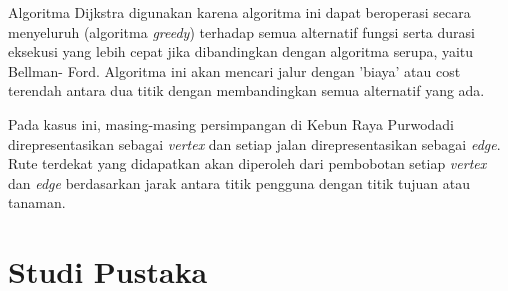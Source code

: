 \documentclass[conference]{IEEEtran}
\begin{document}
    Algoritma Dijkstra digunakan karena algoritma ini dapat
    beroperasi secara menyeluruh (algoritma \textit{greedy}) terhadap
    semua alternatif fungsi serta durasi eksekusi yang lebih cepat
    jika dibandingkan dengan algoritma serupa, yaitu Bellman-
    Ford. Algoritma ini akan mencari jalur dengan ’biaya’ atau cost 
    terendah antara dua titik dengan membandingkan semua alternatif yang ada.
    
    Pada kasus ini, masing-masing persimpangan di Kebun
    Raya Purwodadi direpresentasikan sebagai \textit{vertex} dan setiap
    jalan direpresentasikan sebagai \textit{edge}. Rute terdekat yang didapatkan
    akan diperoleh dari pembobotan setiap \textit{vertex} dan \textit{edge}
    berdasarkan jarak antara titik pengguna dengan titik tujuan
    atau tanaman.

\section{Studi Pustaka}
\end{document}
